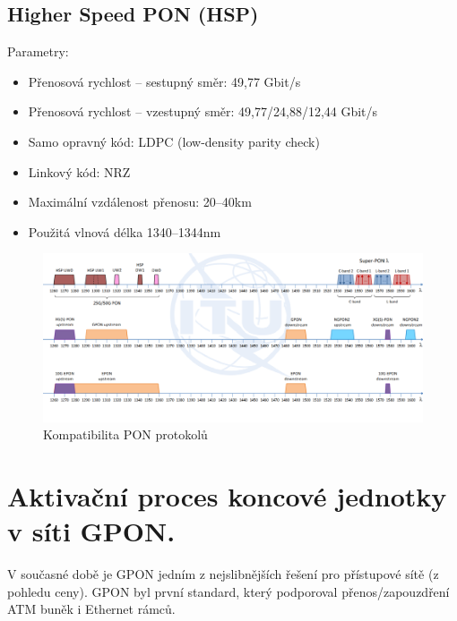\subsection{Higher Speed PON (HSP)}
Parametry:
\begin{itemize}
    \item Přenosová rychlost -- sestupný směr: 49,77 Gbit/s
    \item Přenosová rychlost -- vzestupný směr: 49,77/24,88/12,44 Gbit/s
    \item Samo opravný kód: LDPC (low-density parity check)
    \item Linkový kód: NRZ
    \item Maximální vzdálenost přenosu: 20--40km
    \item Použitá vlnová délka 1340--1344nm
\end{itemize}

\begin{figure}[h]
    \centering
    \includegraphics[width=\textwidth]{snimky/pon-kompatibilita.png}
    \caption{Kompatibilita PON protokolů}
\end{figure}


\clearpage
\section{Aktivační proces koncové jednotky v síti GPON.}
V současné době je GPON jedním z nejslibnějších řešení pro přístupové sítě (z pohledu ceny). GPON byl první standard, který podporoval přenos/zapouzdření ATM buněk i Ethernet rámců.

